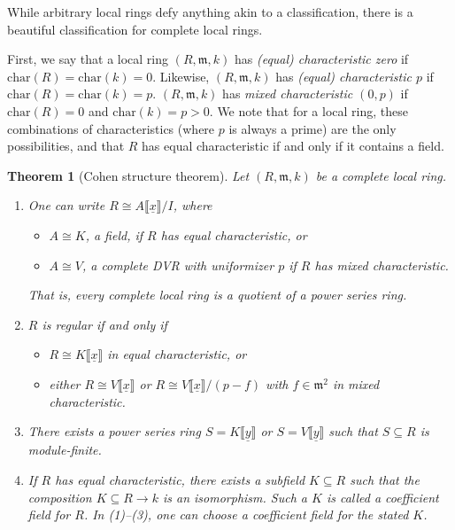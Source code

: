 \documentclass[11pt]{book}
\newtheorem{theorem}{Theorem}[chapter]
\numberwithin{equation}{section}
\numberwithin{theorem}{chapter}
\theoremstyle{definition}
\newtheorem*{basic properties}{Basic Properties}
\newtheorem*{Important Remark}{Important Remark}
\theoremstyle{remark}
\newcommand{\m}{\mathfrak{m}}
\begin{document}
While arbitrary local rings defy anything akin to a classification, there is a beautiful classification for complete local rings.

First, we say that a local ring $(R,\m,k)$ has \emph{(equal) characteristic zero} if $\mathrm{char}(R)=\mathrm{char}(k)=0$. Likewise, $(R,\m,k)$ has \emph{(equal) characteristic $p$} if $\mathrm{char}(R)=\mathrm{char}(k)=p$. $(R,\m,k)$ has \emph{mixed characteristic $(0,p)$} if $\mathrm{char}(R)=0$ and $\mathrm{char}(k)=p>0$. We note that for a local ring, these combinations of characteristics (where $p$ is always a prime) are the only possibilities, and that $R$ has equal characteristic if and only if it contains a field.

\begin{theorem}[Cohen structure theorem]
	Let $(R,\m,k)$ be a complete local ring.
	\begin{enumerate}
		\item One can write $R\cong A\llbracket\underline{x}\rrbracket /I$, where
		\begin{itemize}
			\item $A\cong K$, a field, if $R$ has equal characteristic, or
			\item $A \cong V$, a complete DVR with uniformizer $p$ if $R$ has mixed characteristic.
		\end{itemize} That is, every complete local ring is a quotient of a power series ring.
		\item $R$ is regular if and only if
		\begin{itemize}
			\item $R\cong K\llbracket\underline{x}\rrbracket$ in equal characteristic, or
			\item either $R\cong V\llbracket\underline{x}\rrbracket$ or $R\cong V\llbracket\underline{x}\rrbracket/(p-f)$ with $f\in \m^2$ in mixed characteristic.
		\end{itemize}
	\item There exists a power series ring $S=K\llbracket\underline{y}\rrbracket$ or $S=V\llbracket\underline{y}\rrbracket$ such that $S\subseteq R$ is module-finite.
	\item If $R$ has equal characteristic, there exists a subfield $K\subseteq R$ such that the composition $K\subseteq R \to k$ is an isomorphism. Such a $K$ is called a \emph{coefficient field} for $R$. In (1)--(3), one can choose a coefficient field for the stated $K$.
	\end{enumerate}
\end{theorem}
\end{document}
